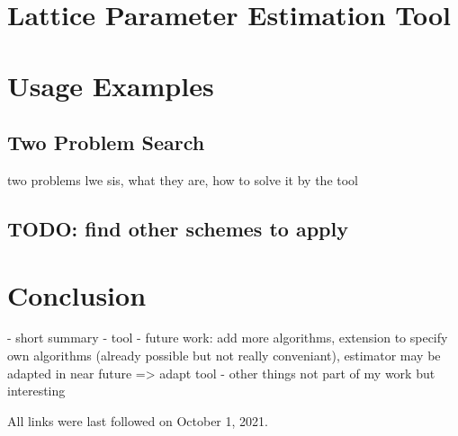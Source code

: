 \documentclass[
  a4paper,  %
  twoside,  %
  bibliography=totoc,
  headsepline,
  cleardoublepage=empty,
  parskip=half,
  draft=false
]{scrbook}
\begin{document}
\chapter{Lattice Parameter Estimation Tool}



\chapter{Usage Examples}
\section{Two Problem Search}\label{sec:two-problem-search}
two problems lwe sis, what they are, how to solve it by the tool
\section{TODO: find other schemes to apply}


\chapter{Conclusion}
- short summary
- tool
- future work: add more algorithms, extension to specify own algorithms (already possible but not really conveniant), estimator may be adapted in near future => adapt tool
- other things not part of my work but interesting



\printbibliography

All links were last followed on October 1, 2021.

\appendix
{}


\pagestyle{empty}
\renewcommand*{\chapterpagestyle}{empty}
\Versicherung
\end{document}
